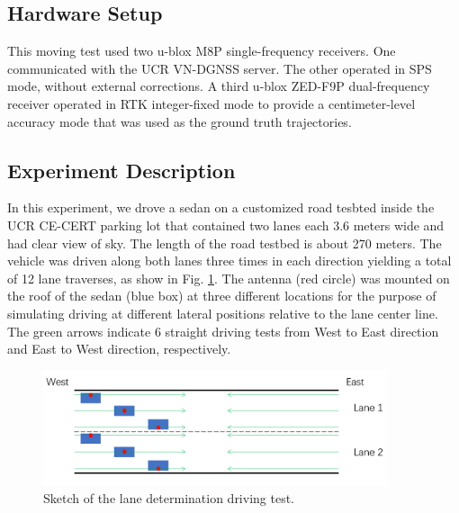 \documentclass[letterpaper, 10 pt,onecolumn]{article}
\begin{document}
	\subsection{Hardware Setup}
	This moving test used two u-blox M8P single-frequency receivers. 
	One communicated with the UCR VN-DGNSS server. The other operated in SPS mode, without external corrections. A third u-blox ZED-F9P dual-frequency receiver operated in RTK integer-fixed mode to provide a centimeter-level accuracy mode that was used as the ground truth trajectories.
	
	\subsection{Experiment Description}
	In this experiment, we drove a sedan on a customized road tesbted inside the UCR CE-CERT parking lot that contained two lanes each 3.6 meters wide \red and had clear view of sky. \black The length of the road testbed is about 270 meters. The vehicle was driven along both lanes three times in each direction yielding a total of 12 lane traverses, as show in Fig. \ref{fig:LDsk}.
	The antenna (red circle) was mounted on the roof of the sedan (blue box) at three different locations for the purpose of simulating driving at different lateral positions relative to the lane center line. The green arrows indicate 6 straight driving tests from West to East direction and East to West direction, respectively. 
	\begin{figure}[H]		
		\centering		
		\includegraphics[width=0.9\textwidth]{figures/LDsketch.png}	
		\caption{Sketch of the lane determination driving test.}		
		\label{fig:LDsk}	
	\end{figure}
	
\end{document}
